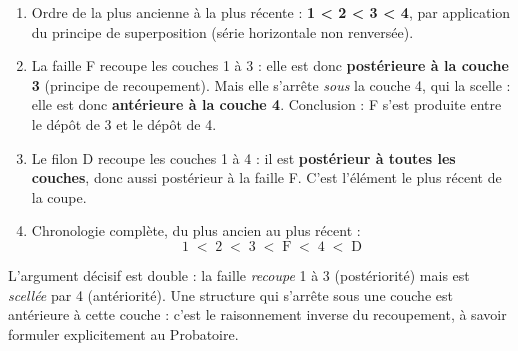 \documentclass[11pt]{article}
\newcommand{\cle}[1]{{\popxbold\color{popdark}#1}}
\begin{document}
\begin{corrige}

\begin{enumerate}
\item Ordre de la plus ancienne à la plus récente : \textbf{1 < 2 < 3 < 4}, par application du \cle{principe de superposition} (série horizontale non renversée).
\item La faille F recoupe les couches 1 à 3 : elle est donc \textbf{postérieure à la couche 3} (principe de recoupement). Mais elle s'arrête \emph{sous} la couche 4, qui la scelle : elle est donc \textbf{antérieure à la couche 4}. Conclusion : F s'est produite entre le dépôt de 3 et le dépôt de 4.
\item Le filon D recoupe les couches 1 à 4 : il est \textbf{postérieur à toutes les couches}, donc aussi postérieur à la faille F. C'est l'élément le plus récent de la coupe.
\item Chronologie complète, du plus ancien au plus récent :
\[ 1 \;<\; 2 \;<\; 3 \;<\; \text{F} \;<\; 4 \;<\; \text{D} \]
\end{enumerate}

\begin{attention}
L'argument décisif est double : la faille \emph{recoupe} 1 à 3 (postériorité) mais est \emph{scellée} par 4 (antériorité). Une structure qui s'arrête sous une couche est antérieure à cette couche : c'est le raisonnement inverse du recoupement, à savoir formuler explicitement au Probatoire.
\end{attention}
\end{corrige}
\end{document}
